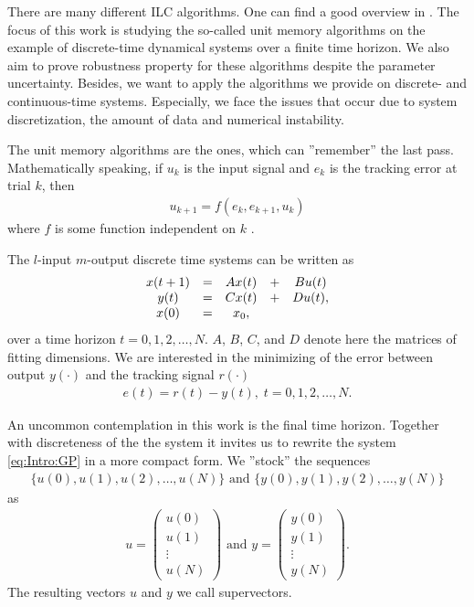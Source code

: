 There are many different ILC algorithms. One can find a good overview in \cite{Bristov06}.
The focus of this work is studying the so-called unit memory algorithms on the example of discrete-time dynamical systems over a finite time horizon. We also aim to prove robustness property for these algorithms despite the parameter uncertainty. Besides, we want to apply the algorithms we provide on discrete- and continuous-time systems. Especially, we face the issues that occur due to system discretization, the amount of data and numerical instability. 


The unit memory algorithms are the ones, which can ''remember'' the last pass. Mathematically speaking, if $u_k$ is the input signal and $e_k$ is the tracking error at trial $k$, then
\begin{align}
u_{k+1} = f(e_k, e_{k+1}, u_k)
\end{align}
where $f$ is some function independent on $k$ \cite{ILC}. 

The $l$-input $m$-output discrete time systems can be written as 
\begin{align}
\label{eq:Intro:GP}
\begin{split}
&\begin{array}{c c c c c}
x(t+1) &= &A x(t)& + &B u(t)  \\
y ( t) &= &C x(t)&  + &D u(t),\\ 
x(0)& = &x_0, & &
\end{array}\\
\end{split}
\end{align}
over a time horizon $t = 0, 1, 2, \dots, N$. $A$, $B$, $C$, and $D$ denote here the matrices of fitting dimensions.
We are interested in the minimizing of the error between output $y(\cdot)$ and the tracking signal $r(\cdot)$
\begin{align}
\label{eq:Intro:error}
e(t) = r(t) - y(t), \; t  = 0, 1, 2, \dots, N. 
\end{align}

An uncommon contemplation in this work is the final time horizon. 
Together with discreteness of the the system it invites us to rewrite the system \eqref{eq:Intro:GP} in a more compact form. We ''stock'' the sequences 
\begin{align*}\{u(0), u(1), u(2), \dots, u(N)\} \text{ and } \{y(0), y(1), y(2), \dots, y(N)\} \end{align*}
as
\begin{align*}
u = \begin{pmatrix}
u(0) \\ u(1) \\ \vdots \\ u(N)
\end{pmatrix} \text{ and }
y = \begin{pmatrix}
y(0) \\ y(1) \\ \vdots \\ y(N)
\end{pmatrix}. 
\end{align*}
The resulting vectors $u$ and $y$ we call supervectors. 

